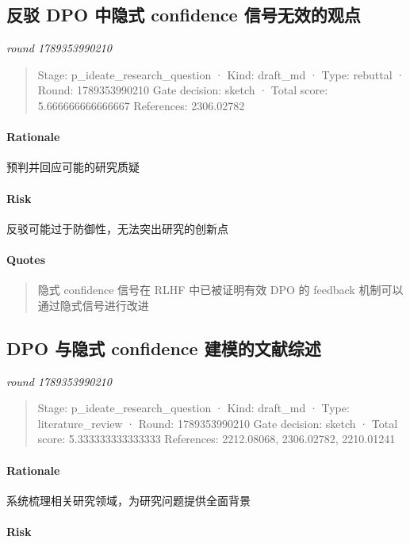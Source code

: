 \documentclass{article}
\begin{document}
\subsection{反驳 DPO 中隐式 confidence 信号无效的观点}
\textit{round 1789353990210}\\
\begin{quote}
Stage: p\_ideate\_research\_question  ·  Kind: draft\_md  ·  Type: rebuttal  ·  Round: 1789353990210
Gate decision: sketch  ·  Total score: 5.666666666666667
References: 2306.02782
\end{quote}

\paragraph{Rationale}

预判并回应可能的研究质疑

\paragraph{Risk}

反驳可能过于防御性，无法突出研究的创新点

\paragraph{Quotes}
\begin{quote}
隐式 confidence 信号在 RLHF 中已被证明有效
DPO 的 feedback 机制可以通过隐式信号进行改进
\end{quote}

\subsection{DPO 与隐式 confidence 建模的文献综述}
\textit{round 1789353990210}\\
\begin{quote}
Stage: p\_ideate\_research\_question  ·  Kind: draft\_md  ·  Type: literature\_review  ·  Round: 1789353990210
Gate decision: sketch  ·  Total score: 5.333333333333333
References: 2212.08068, 2306.02782, 2210.01241
\end{quote}

\paragraph{Rationale}

系统梳理相关研究领域，为研究问题提供全面背景

\paragraph{Risk}
\end{document}
